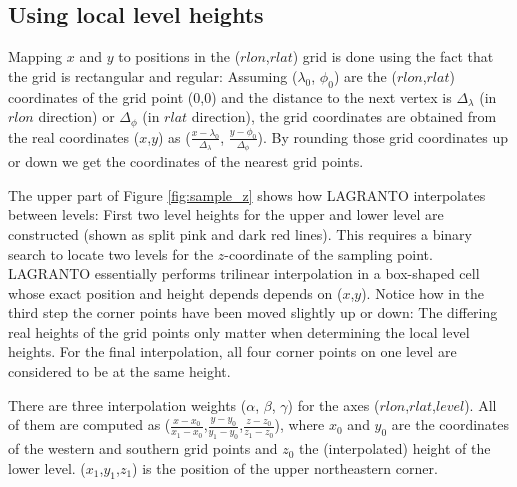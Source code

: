 \subsection{Using local level heights}
Mapping $x$ and $y$ to positions in the ($rlon$,$rlat$) grid is done using the fact that the grid is rectangular and regular: Assuming ($\lambda_0$, $\phi_0$) are the ($rlon$,$rlat$) coordinates of the grid point ($0$,$0$) and the distance to the next vertex is $\Delta_\lambda$ (in $rlon$ direction) or $\Delta_\phi$ (in $rlat$ direction), the grid coordinates are obtained from the real coordinates ($x$,$y$) as ($\frac{x - \lambda_0}{\Delta_\lambda}$, $\frac{y - \phi_0}{\Delta_\phi}$). By rounding those grid coordinates up or down we get the coordinates of the nearest grid points.

The upper part of Figure \ref{fig:sample_z} shows how LAGRANTO interpolates between levels: First two level heights for the upper and lower level are constructed (shown as split pink and dark red lines). This requires a binary search to locate two levels for the $z$-coordinate of the sampling point. LAGRANTO essentially performs trilinear interpolation in a box-shaped cell whose exact position and height depends depends on ($x$,$y$). Notice how in the third step the corner points have been moved slightly up or down: The differing real heights of the grid points only matter when determining the local level heights. For the final interpolation, all four corner points on one level are considered to be at the same height.

There are three interpolation weights ($\alpha$, $\beta$, $\gamma$) for the axes ($rlon$,$rlat$,$level$). All of them are computed as ($\frac{x-x_0}{x_1-x_0}$,$\frac{y-y_0}{y_1-y_0}$,$\frac{z-z_0}{z_1-z_0}$), where $x_0$ and $y_0$ are the coordinates of the western and southern grid points and $z_0$ the (interpolated) height of the lower level. ($x_1$,$y_1$,$z_1$) is the position of the upper northeastern corner.

